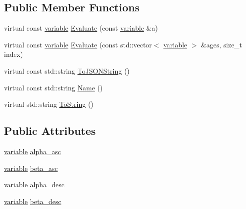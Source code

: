 \subsection*{Public Member Functions}
\begin{DoxyCompactItemize}
\item 
virtual const \hyperlink{structmas_1_1_double_logistic_sel_aa9c8db47e992fdddb25f535eb0d6b343}{variable} \hyperlink{structmas_1_1_double_logistic_sel_a90935c4bb22641c8e3f6e9e742c785ac}{Evaluate} (const \hyperlink{structmas_1_1_double_logistic_sel_aa9c8db47e992fdddb25f535eb0d6b343}{variable} \&a)
\item 
virtual const \hyperlink{structmas_1_1_double_logistic_sel_aa9c8db47e992fdddb25f535eb0d6b343}{variable} \hyperlink{structmas_1_1_double_logistic_sel_ae6c78421dea075fd43bdd30ab0d8fad5}{Evaluate} (const std\-::vector$<$ \hyperlink{structmas_1_1_double_logistic_sel_aa9c8db47e992fdddb25f535eb0d6b343}{variable} $>$ \&ages, size\-\_\-t index)
\item 
virtual const std\-::string \hyperlink{structmas_1_1_double_logistic_sel_af25cc89b1ae6e3b53774c59b8b440699}{To\-J\-S\-O\-N\-String} ()
\item 
virtual const std\-::string \hyperlink{structmas_1_1_double_logistic_sel_a1f71e8df42eb1d1b7b54df4e0427d05b}{Name} ()
\item 
virtual std\-::string \hyperlink{structmas_1_1_double_logistic_sel_ab91353c57277a40f04c505ce77332c65}{To\-String} ()
\end{DoxyCompactItemize}
\subsection*{Public Attributes}
\begin{DoxyCompactItemize}
\item 
\hyperlink{structmas_1_1_double_logistic_sel_aa9c8db47e992fdddb25f535eb0d6b343}{variable} \hyperlink{structmas_1_1_double_logistic_sel_a91765c136da3707bc8500ef4459b801e}{alpha\-\_\-asc}
\item 
\hyperlink{structmas_1_1_double_logistic_sel_aa9c8db47e992fdddb25f535eb0d6b343}{variable} \hyperlink{structmas_1_1_double_logistic_sel_ace010a06a23e4a9145c61c5d022167c6}{beta\-\_\-asc}
\item 
\hyperlink{structmas_1_1_double_logistic_sel_aa9c8db47e992fdddb25f535eb0d6b343}{variable} \hyperlink{structmas_1_1_double_logistic_sel_af9b785ac193b2d14ab923f5a04818abe}{alpha\-\_\-desc}
\item 
\hyperlink{structmas_1_1_double_logistic_sel_aa9c8db47e992fdddb25f535eb0d6b343}{variable} \hyperlink{structmas_1_1_double_logistic_sel_a565d907c1dbd00686a08d624c4b891ea}{beta\-\_\-desc}
\end{DoxyCompactItemize}


